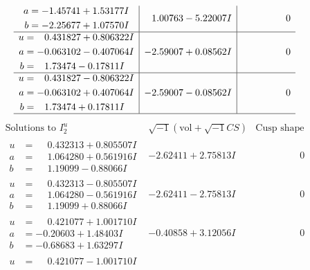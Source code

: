 \documentclass[1p]{elsarticle_modified}
\theoremstyle{definition}
\newcommand{\I}{\sqrt{-1}}
\begin{document}
$$\begin{array}{c|c|c}
\begin{aligned}
a &= -1.45741 + 1.53177 I \\
b &= -2.25677 + 1.07570 I\end{aligned}
 & \phantom{-}1.00763 - 5.22007 I & \phantom{-0.000000 } 0 \\ \hline\begin{aligned}
u &= \phantom{-}0.431827 + 0.806322 I \\
a &= -0.063102 - 0.407064 I \\
b &= \phantom{-}1.73474 - 0.17811 I\end{aligned}
 & -2.59007 + 0.08562 I & \phantom{-0.000000 } 0 \\ \hline\begin{aligned}
u &= \phantom{-}0.431827 - 0.806322 I \\
a &= -0.063102 + 0.407064 I \\
b &= \phantom{-}1.73474 + 0.17811 I\end{aligned}
 & -2.59007 - 0.08562 I & \phantom{-0.000000 } 0\\
 \hline 
 \end{array}$$\newpage$$\begin{array}{c|c|c}  
\text{Solutions to }I^u_{2}& \I (\text{vol} + \sqrt{-1}CS) & \text{Cusp shape}\\
 \hline 
\begin{aligned}
u &= \phantom{-}0.432313 + 0.805507 I \\
a &= \phantom{-}1.064280 + 0.561916 I \\
b &= \phantom{-}1.19099 - 0.88066 I\end{aligned}
 & -2.62411 + 2.75813 I & \phantom{-0.000000 } 0 \\ \hline\begin{aligned}
u &= \phantom{-}0.432313 - 0.805507 I \\
a &= \phantom{-}1.064280 - 0.561916 I \\
b &= \phantom{-}1.19099 + 0.88066 I\end{aligned}
 & -2.62411 - 2.75813 I & \phantom{-0.000000 } 0 \\ \hline\begin{aligned}
u &= \phantom{-}0.421077 + 1.001710 I \\
a &= -0.20603 + 1.48403 I \\
b &= -0.68683 + 1.63297 I\end{aligned}
 & -0.40858 + 3.12056 I & \phantom{-0.000000 } 0 \\ \hline\begin{aligned}
u &= \phantom{-}0.421077 - 1.001710 I \\

\end{aligned}
\end{array}$$
\end{document}
